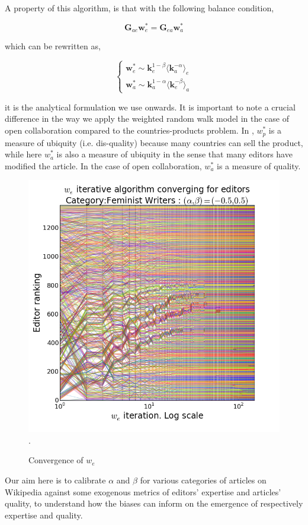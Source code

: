 A property of this algorithm, is that with the following balance condition,

\begin{equation}
\mathbf{G}_{ae} \mathbf{w}^*_e = \mathbf{G}_{ea} \mathbf{w}^*_a
\end{equation}

which can be rewritten as,

\begin{equation}
\begin{cases}
\mathbf{w}^{*}_{e} \sim \mathbf{k}^{1-\beta}_{e} \langle \mathbf{k}_{a}^{-\alpha}\rangle_e \\
\mathbf{w}^{*}_{a} \sim \mathbf{k}^{1-\alpha}_{a} \langle \mathbf{k}_{e}^{-\beta}\rangle_a
\end{cases} \label{eqsim}
\end{equation}



it is the analytical formulation we use onwards. It is important to note a crucial difference in the way we apply the weighted random walk model in the case of open collaboration compared to the countries-products problem. In \cite{caldarelli2012network}, $w^*_p$ is a measure of ubiquity (i.e. dis-quality) because many countries can sell the product, while here $w^*_a$ is also a measure of ubiquity in the sense that many editors have modified the article. In the case of open collaboration, $w^*_a$ is a measure of quality.

\begin{figure}[!t]
\centering
\includegraphics[width=0.9\columnwidth]{Figures/fem_editors_iter_converge.png}.
\caption{Convergence of $w_e$}
\label{fig:convergence}
\end{figure}

Our aim here is to calibrate $\alpha$ and $\beta$ for various categories of articles on Wikipedia against some exogenous metrics of editors' expertise and articles' quality, to understand how the biases can inform on the emergence of respectively expertise and quality.